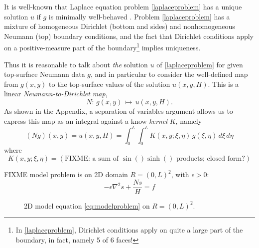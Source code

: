 \documentclass[letterpaper,final,12pt,reqno]{amsart}
\theoremstyle{cstyle}
\theoremstyle{cstyle*}
\theoremstyle{dstyle}
\numberwithin{equation}{section}
\numberwithin{figure}{section}
\numberwithin{table}{section}
\numberwithin{theorem}{section}
\newcommand{\eps}{\epsilon}
\newcommand{\grad}{\nabla}
\begin{document}
It is well-known that Laplace equation problem \eqref{laplaceproblem} has a unique solution $u$ if $g$ is minimally well-behaved \cite{Elmanetal2014,Evans2010}.  Problem \eqref{laplaceproblem} has a mixture of homogeneous Dirichlet (bottom and sides) and nonhomogeneous Neumann (top) boundary conditions, and the fact that  Dirichlet conditions apply on a positive-measure part of the boundary\footnote{In \eqref{laplaceproblem}, Dirichlet conditions apply on quite a large part of the boundary, in fact, namely 5 of 6 faces!} implies uniqueness.

Thus it is reasonable to talk about \emph{the} solution $u$ of \eqref{laplaceproblem} for given top-surface Neumann data $g$, and in particular to consider the well-defined map from $g(x,y)$ to the top-surface values of the solution $u(x,y,H)$.  This is a linear \emph{Neumann-to-Dirichlet map},
\begin{equation}
N : \, g(x,y) \, \mapsto \, u(x,y,H).  \label{eq:ntod}
\end{equation}
As shown in the Appendix, a separation of variables argument allows us to express this map as an integral against a know \emph{kernel} $K$, namely
\begin{equation}
(N g)(x,y) = u(x,y,H) = \int_0^L \int_0^L K(x,y;\xi,\eta)\, g(\xi,\eta)\,d\xi\,d\eta  \label{eq:ntodformula}
\end{equation}
where
\begin{equation}
K(x,y;\xi,\eta) = (\text{FIXME: a sum of $\sin() \sinh()$ products; closed form?})  \label{eq:kernelformula}
\end{equation}

FIXME model problem is on 2D domain $R = (0,L)^2$, with $\eps>0$:
\begin{equation}
-\eps \grad^2 s + \frac{N s}{H} = f  \label{eq:modelproblem}
\end{equation}

\begin{figure}
\label{fig:modelproblem}
\caption{2D model equation \eqref{eq:modelproblem} on $R = (0,L)^2$.}
\end{figure}
\end{document}
